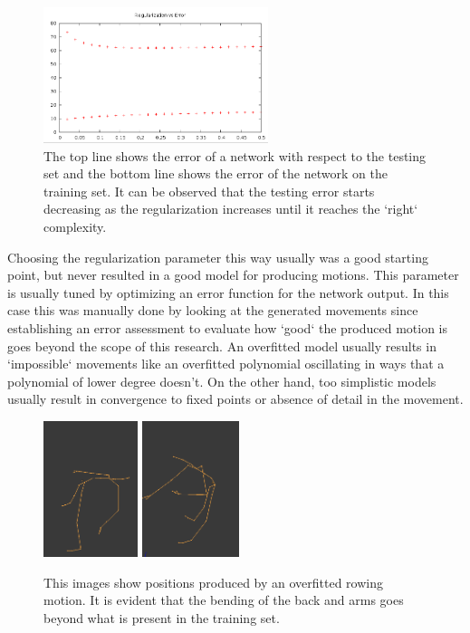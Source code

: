 \documentclass[letterpaper,9pt]{article}
\begin{document}
\begin{figure}[h!]
  \centering
    \includegraphics[height=150px]{Extra/regularization_vs_error.png}
    \caption[Error and Regularization]{The top line shows the error of a network with respect to the testing set and the bottom line shows the error of the network on the training set. It can be observed that the testing error starts decreasing as the regularization increases until it reaches the `right` complexity.}
\end{figure}

Choosing the regularization parameter this way usually was a good starting point, but never resulted in a good model for producing motions. This parameter is usually tuned by optimizing an error function for the network output. In this case this was manually done by looking at the generated movements since establishing an error assessment to evaluate how `good` the produced motion is goes beyond the scope of this research. An overfitted model usually results in `impossible` movements like an overfitted polynomial oscillating in ways that a polynomial of lower degree doesn't. On the other hand, too simplistic models usually result in convergence to fixed points or absence of detail in the movement.

\begin{figure}[h!]
  \centering
  \includegraphics[height=150px]{Extra/overfitting_1.png}
  \includegraphics[height=150px]{Extra/overfitting_2.png}
  \caption[Error and Regularization]{This images show positions produced by an overfitted rowing motion. It is evident that the bending of the back and arms goes beyond what is present in the training set.}
\end{figure}
\end{document}
